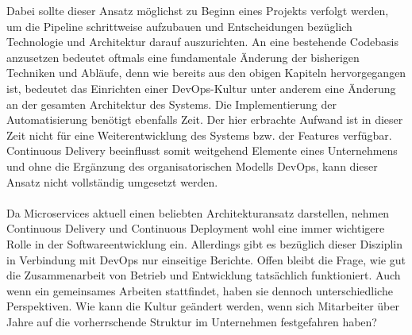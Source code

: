 Dabei sollte dieser Ansatz möglichst zu Beginn eines Projekts verfolgt werden, um die Pipeline schrittweise aufzubauen und Entscheidungen bezüglich Technologie und Architektur darauf auszurichten. An eine bestehende Codebasis anzusetzen bedeutet oftmals eine fundamentale Änderung der bisherigen Techniken und Abläufe, denn wie bereits aus den obigen Kapiteln hervorgegangen ist, bedeutet das Einrichten einer DevOps-Kultur unter anderem eine Änderung an der gesamten Architektur des Systems. Die Implementierung der Automatisierung benötigt ebenfalls Zeit. Der hier erbrachte Aufwand ist in dieser Zeit nicht für eine Weiterentwicklung des Systems bzw. der Features verfügbar. Continuous Delivery beeinflusst somit weitgehend Elemente eines Unternehmens und ohne die Ergänzung des organisatorischen Modells DevOps, kann dieser Ansatz nicht vollständig umgesetzt werden.\\ \\
Da Microservices aktuell einen beliebten Architekturansatz darstellen, nehmen Continuous Delivery und Continuous Deployment wohl eine immer wichtigere Rolle in der Softwareentwicklung ein. Allerdings gibt es bezüglich dieser Disziplin in Verbindung mit DevOps nur einseitige Berichte. Offen bleibt die Frage, wie gut die Zusammenarbeit von Betrieb und Entwicklung tatsächlich funktioniert. Auch wenn ein gemeinsames Arbeiten stattfindet, haben sie dennoch unterschiedliche Perspektiven. Wie kann die Kultur geändert werden, wenn sich Mitarbeiter über Jahre auf die vorherrschende Struktur im Unternehmen festgefahren haben? 


\ifCLASSOPTIONcaptionsoff
  \newpage
\fi